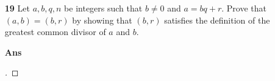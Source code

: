 \documentclass[paper=usletter, fontsize=12pt]{article}
\begin{document}
\begin{itemize}
\begin{itemize}
                \item[\textbf{19}] Let $a, b, q, n$ be integers such that $b
                \ne 0$ and $a = bq + r$. Prove that $(a, b) = (b, r)$ by
                showing that $(b, r)$ satisfies the definition of the greatest
                common divisor of $a$ and $b$.
                \item[\textbf{Ans}]
                \begin{proof}[\unskip\nopunct]
                \end{proof}
                \vspace{0.2in}

            \end{itemize}







\end{itemize}
\end{document}

